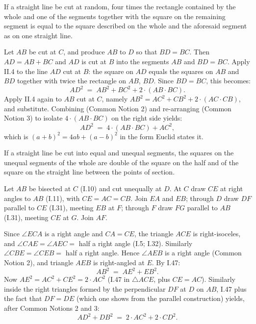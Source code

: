 \documentclass{rrxiv}
\begin{document}
\begin{claim}
\label{prop:II.8}
If a straight line be cut at random, four times the rectangle
contained by the whole and one of the segments together with the
square on the remaining segment is equal to the square described on
the whole and the aforesaid segment as on one straight line.
\end{claim}
\begin{evidence}[Proof of II.8]
\label{ev:II.8}
Let $AB$ be cut at $C$, and produce $AB$ to $D$ so that $BD = BC$.
Then $AD = AB + BC$ and $AD$ is cut at $B$ into the segments $AB$
and $BD = BC$.  Apply II.4 to the line $AD$ cut at $B$: the square
on $AD$ equals the squares on $AB$ and $BD$ together with twice the
rectangle on $AB$, $BD$.  Since $BD = BC$, this becomes:
\[
    AD^2 \;=\; AB^2 + BC^2 + 2\cdot(AB\cdot BC).
\]
Apply II.4 again to $AB$ cut at $C$, namely $AB^2 = AC^2 + CB^2 +
2\cdot(AC\cdot CB)$, and substitute.  Combining (Common Notion 2)
and re-arranging (Common Notion 3) to isolate $4\cdot(AB\cdot BC)$
on the right side yields:
\[
    AD^2 \;=\; 4\cdot(AB\cdot BC) + AC^2,
\]
which is $(a+b)^2 = 4ab + (a-b)^2$ in the form Euclid states it.
\end{evidence}

\begin{claim}
\label{prop:II.9}
If a straight line be cut into equal and unequal segments, the
squares on the unequal segments of the whole are double of the square
on the half and of the square on the straight line between the points
of section.
\end{claim}
\begin{evidence}[Proof of II.9]
\label{ev:II.9}
Let $AB$ be bisected at $C$ (I.10) and cut unequally at $D$.  At $C$
draw $CE$ at right angles to $AB$ (I.11), with $CE = AC = CB$.  Join
$EA$ and $EB$; through $D$ draw $DF$ parallel to $CE$ (I.31), meeting
$EB$ at $F$; through $F$ draw $FG$ parallel to $AB$ (I.31), meeting
$CE$ at $G$.  Join $AF$.

Since $\angle ECA$ is a right angle and $CA = CE$, the triangle
$ACE$ is right-isoceles, and $\angle CAE = \angle AEC = $ half a right
angle (I.5; I.32).  Similarly $\angle CBE = \angle CEB = $ half a
right angle.  Hence $\angle AEB$ is a right angle (Common Notion 2),
and triangle $AEB$ is right-angled at $E$.  By I.47:
\[
    AB^2 \;=\; AE^2 + EB^2.
\]
Now $AE^2 = AC^2 + CE^2 = 2\cdot AC^2$ (I.47 in $\triangle ACE$,
plus $CE = AC$).  Similarly inside the right triangles formed by the
perpendicular $DF$ at $D$ on $AB$, I.47 plus the fact that
$DF = DE$ (which one shows from the parallel construction)
yields, after Common Notions 2 and 3:
\[
    AD^2 + DB^2 \;=\; 2\cdot AC^2 + 2\cdot CD^2.
\]
\end{evidence}
\end{document}
